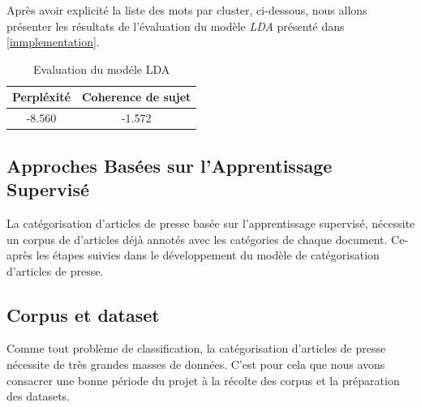     Après avoir explicité la liste des mots par cluster, ci-dessous, nous allons présenter les résultats de l'évaluation du modèle \emph{LDA} présenté dans \ref{inmplementation}.
    \begin{table}[H]
        \begin{center}
            \begin{tabular}{|c|c|}
                \hline
                \textbf{Perpléxité} & \textbf{Coherence de sujet} \\
                \hline
                -8.560 &-1.572  \\
                \hline
            \end{tabular}
        \end{center}
        \caption{Evaluation du modéle LDA}
        \label{Eval LDA}
    \end{table}


\subsection{Approches Basées sur l'Apprentissage Supervisé}
La catégorisation d'articles de presse basée sur l'apprentissage supervisé, nécessite un corpus de d'articles déjà annotés avec les catégories de chaque document. Ce-après les étapes suivies dans le développement du modèle de catégorisation d'articles de presse.
\subsection{Corpus et dataset}
Comme tout problème de classification, la catégorisation d'articles de presse nécessite de très grandes masses de données. C'est pour cela que nous avons consacrer une bonne période du projet à la récolte des corpus et la préparation des datasets.     
